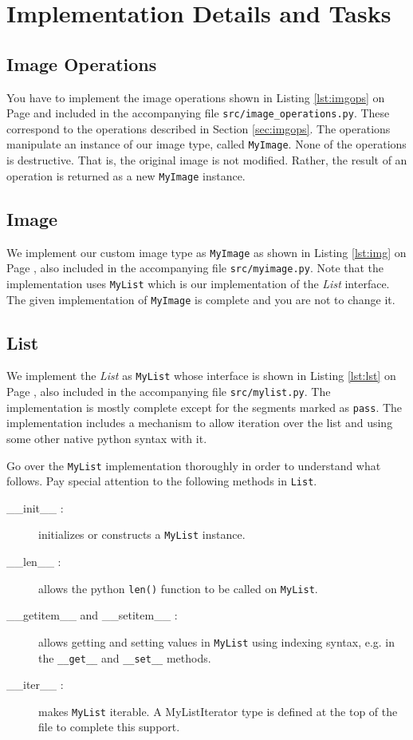 \documentclass[addpoints]{exam}
\begin{document}
\section{Implementation Details and Tasks}

\subsection{Image Operations}

You have to implement the image operations shown in Listing \ref{lst:imgops} on Page \pageref{lst:imgops} and included in the accompanying file \texttt{src/image\_operations.py}. These correspond to the operations described in Section \ref{sec:imgops}. The operations manipulate an instance of our image type,  called \texttt{MyImage}. None of the operations is destructive. That is, the original image is not modified. Rather, the result of an operation is returned as a new \texttt{MyImage} instance. 

\subsection{Image}

We implement our custom image type as \texttt{MyImage} as shown in Listing \ref{lst:img} on Page \pageref{lst:img}, also included in the accompanying file \texttt{src/myimage.py}. Note that the implementation uses \texttt{MyList} which is our implementation of the \textit{List} interface. The given implementation of \texttt{MyImage} is complete and you are not to change it.

\subsection{List}

We implement the \textit{List} as \texttt{MyList} whose interface is shown in Listing \ref{lst:lst} on Page \pageref{lst:lst}, also included in the accompanying file \texttt{src/mylist.py}. The implementation is mostly complete except for the segments marked as \texttt{pass}. The implementation includes a mechanism to allow iteration over the list and using some other native python syntax with it.

Go over the \texttt{MyList} implementation thoroughly in order to understand what follows. Pay special attention to the following methods in \texttt{List}.
\begin{description}
\item[\_\_init\_\_ :] initializes or constructs a \texttt{MyList} instance.
\item[\_\_len\_\_ :] allows the python \texttt{len()} function to be called on \texttt{MyList}.
\item[\_\_getitem\_\_ and \_\_setitem\_\_ :] allows getting and setting values in \texttt{MyList} using indexing syntax, e.g. in the \texttt{\_\_get\_\_} and \texttt{\_\_set\_\_} methods.
\item[\_\_iter\_\_ :] makes \texttt{MyList} iterable. A MyListIterator type is defined at the top of the file to complete this support.
\end{description}
\end{document}
